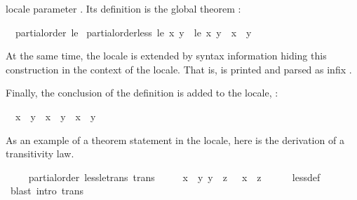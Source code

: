 \begin{isabellebody}
\begin{isamarkuptext}
  locale parameter .  Its definition is the global theorem
  :
  \begin{isabelle}%
\ \ partial{\isacharunderscore}order\ {\isacharquery}le\ {\isasymLongrightarrow}\isanewline
\isaindent{\ \ }partial{\isacharunderscore}order{\isachardot}less\ {\isacharquery}le\ {\isacharquery}x\ {\isacharquery}y\ {\isacharequal}\ {\isacharparenleft}{\isacharquery}le\ {\isacharquery}x\ {\isacharquery}y\ {\isasymand}\ {\isacharquery}x\ {\isasymnoteq}\ {\isacharquery}y{\isacharparenright}%
\end{isabelle}
  At the same time, the locale is extended by syntax information
  hiding this construction in the context of the locale.  That is,
   is printed and parsed as infix
  \isa{{\isasymsqsubset}}.%
\end{isamarkuptext}%
\isamarkuptrue%
%
\begin{isamarkuptext}%
Finally, the conclusion of the definition
  is added to the locale, :
  \begin{isabelle}%
\ \ {\isacharparenleft}{\isacharquery}x\ {\isasymsqsubset}\ {\isacharquery}y{\isacharparenright}\ {\isacharequal}\ {\isacharparenleft}{\isacharquery}x\ {\isasymsqsubseteq}\ {\isacharquery}y\ {\isasymand}\ {\isacharquery}x\ {\isasymnoteq}\ {\isacharquery}y{\isacharparenright}%
\end{isabelle}%
\end{isamarkuptext}%
\isamarkuptrue%
%
\begin{isamarkuptext}%
As an example of a theorem statement in the locale, here is the
  derivation of a transitivity law.%
\end{isamarkuptext}%
\isamarkuptrue%
\ \ \isamarkupfalse%
\ {\isacharparenleft}\ partial{\isacharunderscore}order{\isacharparenright}\ less{\isacharunderscore}le{\isacharunderscore}trans\ {\isacharbrackleft}trans{\isacharbrackright}{\isacharcolon}\isanewline
\ \ \ \ {\isachardoublequoteopen}{\isasymlbrakk}\ x\ {\isasymsqsubset}\ y{\isacharsemicolon}\ y\ {\isasymsqsubseteq}\ z\ {\isasymrbrakk}\ {\isasymLongrightarrow}\ x\ {\isasymsqsubset}\ z{\isachardoublequoteclose}\isanewline
%
\isadelimvisible
\ \ \ \ %
\endisadelimvisible
%
\isatagvisible
{}\isamarkupfalse%
\ less{\isacharunderscore}def\ \isamarkupfalse%
\ {\isacharparenleft}blast\ intro{\isacharcolon}\ trans{\isacharparenright}%
\endisatagvisible

\end{isabellebody}
